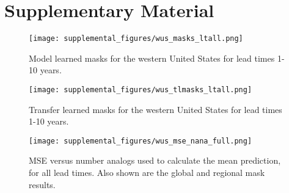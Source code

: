 \section{Supplementary Material}\label{sec:appendix}



\begin{figure}[h!]
    \centering
    \noindent\texttt{[image: supplemental\_figures/wus\_masks\_ltall.png]}
    \caption[Western United States learned masks, 1-10 years]{
        Model learned masks for the western United States for lead times 1-10 years.
    }
    \label{fig:wus_all_learned_masks}
\end{figure}

\begin{figure}[h!]
    \centering
    \noindent\texttt{[image: supplemental\_figures/wus\_tlmasks\_ltall.png]}
    \caption[Western United States transfer learned masks, 1-10 years]{
        Transfer learned masks for the western United States for lead times 1-10 years.
    }
    \label{fig:wus_all_tl_masks}
\end{figure}



\begin{figure}[h!]
    \centering
    \noindent\texttt{[image: supplemental\_figures/wus\_mse\_nana\_full.png]}
    \caption[MSE versus number of analogs]{
        MSE versus number analogs used to calculate the mean prediction, for all lead times.
        Also shown are the global and regional mask results.
    }
    \label{fig:mse_nana_full}
\end{figure}

